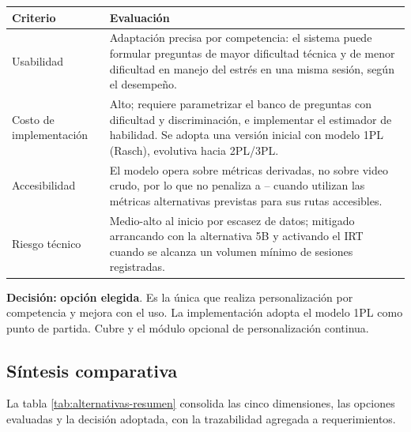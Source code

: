 \begin{table}[ht]
\centering\footnotesize
\renewcommand{\arraystretch}{1.2}
\begin{tabularx}{\linewidth}{@{}p{3.6cm} Y@{}}
\toprule
\textbf{Criterio} & \textbf{Evaluación} \\
\midrule
Usabilidad & Adaptación precisa por competencia: el sistema puede
formular preguntas de mayor dificultad técnica y de menor dificultad
en manejo del estrés en una misma sesión, según el desempeño. \\
Costo de implementación & Alto; requiere parametrizar el banco de
preguntas con dificultad y discriminación, e implementar el estimador
de habilidad. Se adopta una versión inicial con modelo 1PL
(Rasch), evolutiva hacia 2PL/3PL. \\
Accesibilidad & El modelo opera sobre métricas derivadas, no sobre
video crudo, por lo que no penaliza a -- cuando utilizan
las métricas alternativas previstas para sus rutas accesibles. \\
Riesgo técnico & Medio-alto al inicio por escasez de datos; mitigado
arrancando con la alternativa 5B y activando el IRT cuando se
alcanza un volumen mínimo de sesiones registradas. \\
\bottomrule
\end{tabularx}
\end{table}

\noindent\textbf{Decisión:} \textbf{opción elegida}. Es la única que
realiza personalización por competencia y mejora con el uso. La
implementación adopta el modelo 1PL como punto de partida. Cubre
 y el módulo opcional de personalización continua.

\subsection{Síntesis comparativa}

La tabla \ref{tab:alternativas-resumen} consolida las cinco
dimensiones, las opciones evaluadas y la decisión adoptada, con la
trazabilidad agregada a requerimientos.

